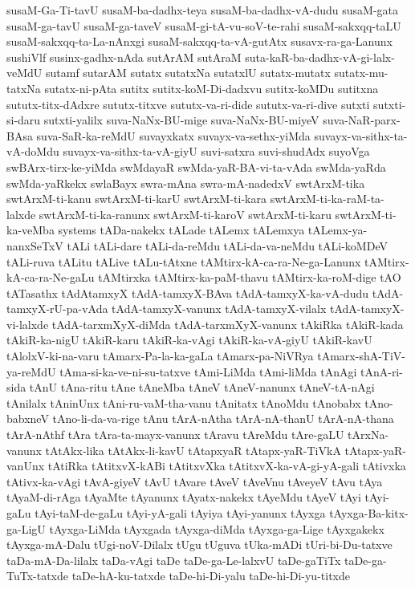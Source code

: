 {susaM-Ga-Ti-tavU
susaM-ba-dadhx-teya
susaM-ba-dadhx-vA-dudu
susaM-gata
susaM-ga-tavU
susaM-ga-taveV
susaM-gi-tA-vu-soV-te-rahi
susaM-sakxqq-taLU
susaM-sakxqq-ta-La-nAnxgi
susaM-sakxqq-ta-vA-gutAtx
susavx-ra-ga-Lanunx
sushiVlf
susinx-gadhx-nAda
sutArAM
sutAraM
suta-kaR-ba-dadhx-vA-gi-lalx-veMdU
sutamf
sutarAM
sutatx
sutatxNa
sutatxlU
sutatx-mutatx
sutatx-mu-tatxNa
sutatx-ni-pAta
sutitx
sutitx-koM-Di-dadxvu
sutitx-koMDu
sutitxna
sututx-titx-dAdxre
sututx-titxve
sututx-va-ri-dide
sututx-va-ri-dive
sutxti
sutxti-si-daru
sutxti-yalilx
suva-NaNx-BU-mige
suva-NaNx-BU-miyeV
suva-NaR-parx-BAsa
suva-SaR-ka-reMdU
suvayxkatx
suvayx-va-sethx-yiMda
suvayx-va-sithx-ta-vA-doMdu
suvayx-va-sithx-ta-vA-giyU
suvi-satxra
suvi-shudAdx
suyoVga
swBArx-tirx-ke-yiMda
swMdayaR
swMda-yaR-BA-vi-ta-vAda
swMda-yaRda
swMda-yaRkekx
swlaBayx
swra-mAna
swra-mA-nadedxV
swtArxM-tika
swtArxM-ti-kanu
swtArxM-ti-karU
swtArxM-ti-kara
swtArxM-ti-ka-raM-ta-lalxde
swtArxM-ti-ka-ranunx
swtArxM-ti-karoV
swtArxM-ti-karu
swtArxM-ti-ka-veMba
systems
tADa-nakekx
tALade
tALemx
tALemxya
tALemx-ya-nanxSeTxV
tALi
tALi-dare
tALi-da-reMdu
tALi-da-va-neMdu
tALi-koMDeV
tALi-ruva
tALitu
tALive
tALu-tAtxne
tAMtirx-kA-ca-ra-Ne-ga-Lanunx
tAMtirx-kA-ca-ra-Ne-gaLu
tAMtirxka
tAMtirx-ka-paM-thavu
tAMtirx-ka-roM-dige
tAO
tATasathx
tAdAtamxyX
tAdA-tamxyX-BAva
tAdA-tamxyX-ka-vA-dudu
tAdA-tamxyX-rU-pa-vAda
tAdA-tamxyX-vanunx
tAdA-tamxyX-vilalx
tAdA-tamxyX-vi-lalxde
tAdA-tarxmXyX-diMda
tAdA-tarxmXyX-vanunx
tAkiRka
tAkiR-kada
tAkiR-ka-nigU
tAkiR-karu
tAkiR-ka-vAgi
tAkiR-ka-vA-giyU
tAkiR-kavU
tAlolxV-ki-na-varu
tAmarx-Pa-la-ka-gaLa
tAmarx-pa-NiVRya
tAmarx-shA-TiV-ya-reMdU
tAma-si-ka-ve-ni-su-tatxve
tAmi-LiMda
tAmi-liMda
tAnAgi
tAnA-ri-sida
tAnU
tAna-ritu
tAne
tAneMba
tAneV
tAneV-nanunx
tAneV-tA-nAgi
tAnilalx
tAninUnx
tAni-ru-vaM-tha-vanu
tAnitatx
tAnoMdu
tAnobabx
tAno-babxneV
tAno-li-da-va-rige
tAnu
tArA-nAtha
tArA-nA-thanU
tArA-nA-thana
tArA-nAthf
tAra
tAra-ta-mayx-vanunx
tAravu
tAreMdu
tAre-gaLU
tArxNa-vanunx
tAtAkx-lika
tAtAkx-li-kavU
tAtapxyaR
tAtapx-yaR-TiVkA
tAtapx-yaR-vanUnx
tAtiRka
tAtitxvX-kABi
tAtitxvXka
tAtitxvX-ka-vA-gi-yA-gali
tAtivxka
tAtivx-ka-vAgi
tAvA-giyeV
tAvU
tAvare
tAveV
tAveVnu
tAveyeV
tAvu
tAya
tAyaM-di-rAga
tAyaMte
tAyanunx
tAyatx-nakekx
tAyeMdu
tAyeV
tAyi
tAyi-gaLu
tAyi-taM-de-gaLu
tAyi-yA-gali
tAyiya
tAyi-yanunx
tAyxga
tAyxga-Ba-kitx-ga-LigU
tAyxga-LiMda
tAyxgada
tAyxga-diMda
tAyxga-ga-Lige
tAyxgakekx
tAyxga-mA-Dalu
tUgi-noV-Dilalx
tUgu
tUguva
tUka-mADi
tUri-bi-Du-tatxve
taDa-mA-Da-lilalx
taDa-vAgi
taDe
taDe-ga-Le-lalxvU
taDe-gaTiTx
taDe-ga-TuTx-tatxde
taDe-hA-ku-tatxde
taDe-hi-Di-yalu
taDe-hi-Di-yu-titxde
}
